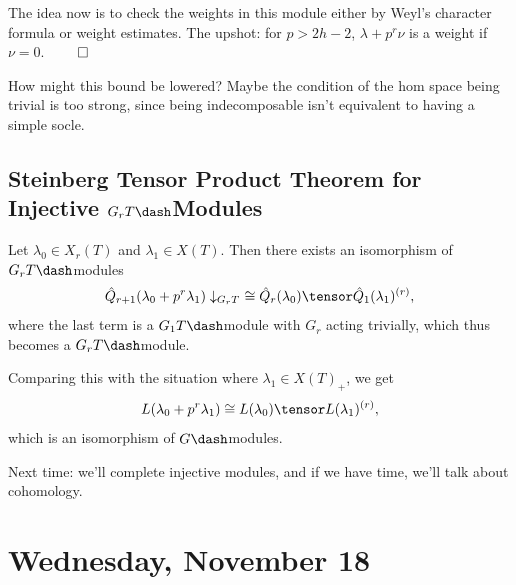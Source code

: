 The idea now is to check the weights in this module either by Weyl's
character formula or weight estimates. The upshot: for \(p>2h-2\),
\(\lambda+ p^r \nu\) is a weight if \(\nu = 0\). \(\qed\)

How might this bound be lowered? Maybe the condition of the hom space
being trivial is too strong, since being indecomposable isn't equivalent
to having a simple socle.

\hypertarget{steinberg-tensor-product-theorem-for-injective-g_r-tdashmodules}{%
\subsection{\texorpdfstring{Steinberg Tensor Product Theorem for
Injective
\(G_r T\dash\)Modules}{Steinberg Tensor Product Theorem for Injective G\_r T\textbackslash dashModules}}\label{steinberg-tensor-product-theorem-for-injective-g_r-tdashmodules}}

\begin{proposition}[?]

Let \(\lambda_0 \in X_r(T)\) and \(\lambda_1 \in X(T)\). Then there
exists an isomorphism of \(G_r T\dash\)modules
\begin{align*}  
\hat{Q}_{r+1}(\lambda_0 + p^r \lambda_1)\downarrow_{G_r T} 
\,\, \cong \hat{Q}_r(\lambda_0) \tensor \hat{Q}_1(\lambda_1)^{(r)}
,\end{align*} where the last term is a \(G_1 T\dash\)module with \(G_r\)
acting trivially, which thus becomes a \(G_r T\dash\)module.

\end{proposition}

\begin{remark}

Comparing this with the situation where \(\lambda_1 \in X(T)_+\), we get
\begin{align*}  
L(\lambda_0 + p^r \lambda_1) 
\cong L(\lambda_0) \tensor L(\lambda_1)^{(r)}
,\end{align*} which is an isomorphism of \(G\dash\)modules.

\end{remark}

Next time: we'll complete injective modules, and if we have time, we'll
talk about cohomology.

\hypertarget{wednesday-november-18}{%
\section{Wednesday, November 18}\label{wednesday-november-18}}

